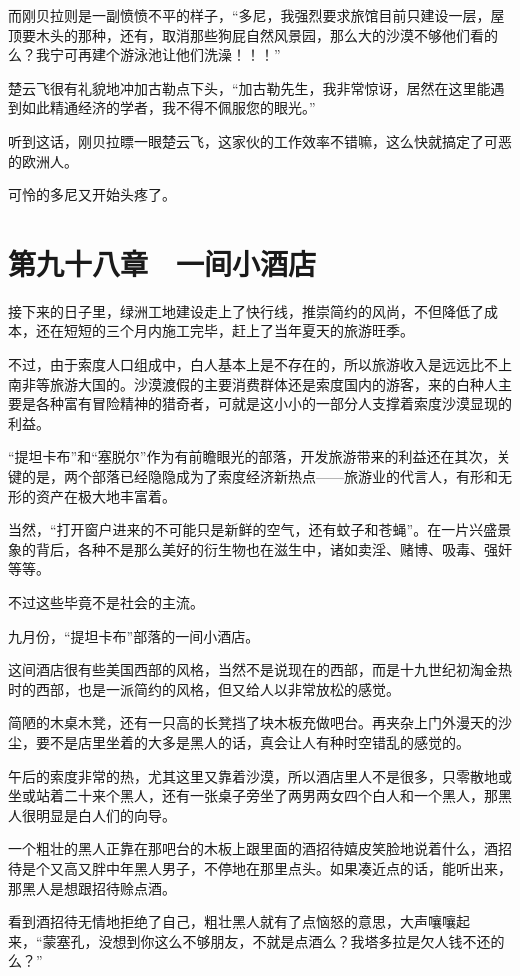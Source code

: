 而刚贝拉则是一副愤愤不平的样子，“多尼，我强烈要求旅馆目前只建设一层，屋顶要木头的那种，还有，取消那些狗屁自然风景园，那么大的沙漠不够他们看的么？我宁可再建个游泳池让他们洗澡！！！”

楚云飞很有礼貌地冲加古勒点下头，“加古勒先生，我非常惊讶，居然在这里能遇到如此精通经济的学者，我不得不佩服您的眼光。”

听到这话，刚贝拉瞟一眼楚云飞，这家伙的工作效率不错嘛，这么快就搞定了可恶的欧洲人。

可怜的多尼又开始头疼了。

\section{第九十八章　一间小酒店}

接下来的日子里，绿洲工地建设走上了快行线，推崇简约的风尚，不但降低了成本，还在短短的三个月内施工完毕，赶上了当年夏天的旅游旺季。

不过，由于索度人口组成中，白人基本上是不存在的，所以旅游收入是远远比不上南非等旅游大国的。沙漠渡假的主要消费群体还是索度国内的游客，来的白种人主要是各种富有冒险精神的猎奇者，可就是这小小的一部分人支撑着索度沙漠显现的利益。

“提坦卡布”和“塞脱尔”作为有前瞻眼光的部落，开发旅游带来的利益还在其次，关键的是，两个部落已经隐隐成为了索度经济新热点——旅游业的代言人，有形和无形的资产在极大地丰富着。

当然，“打开窗户进来的不可能只是新鲜的空气，还有蚊子和苍蝇”。在一片兴盛景象的背后，各种不是那么美好的衍生物也在滋生中，诸如卖淫、赌博、吸毒、强奸等等。

不过这些毕竟不是社会的主流。

九月份，“提坦卡布”部落的一间小酒店。

这间酒店很有些美国西部的风格，当然不是说现在的西部，而是十九世纪初淘金热时的西部，也是一派简约的风格，但又给人以非常放松的感觉。

简陋的木桌木凳，还有一只高的长凳挡了块木板充做吧台。再夹杂上门外漫天的沙尘，要不是店里坐着的大多是黑人的话，真会让人有种时空错乱的感觉的。

午后的索度非常的热，尤其这里又靠着沙漠，所以酒店里人不是很多，只零散地或坐或站着二十来个黑人，还有一张桌子旁坐了两男两女四个白人和一个黑人，那黑人很明显是白人们的向导。

一个粗壮的黑人正靠在那吧台的木板上跟里面的酒招待嬉皮笑脸地说着什么，酒招待是个又高又胖中年黑人男子，不停地在那里点头。如果凑近点的话，能听出来，那黑人是想跟招待赊点酒。

看到酒招待无情地拒绝了自己，粗壮黑人就有了点恼怒的意思，大声嚷嚷起来，“蒙塞孔，没想到你这么不够朋友，不就是点酒么？我塔多拉是欠人钱不还的么？”

